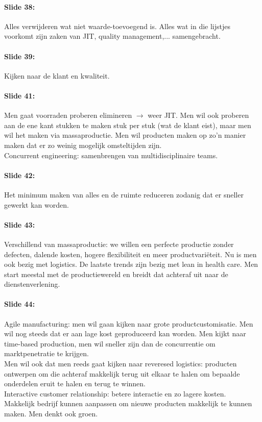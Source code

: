 \documentclass[10pt,a4paper]{report}
\begin{document}
\paragraph{Slide 38:} Alles verwijderen wat niet waarde-toevoegend is.
Alles wat in die lijstjes voorkomt zijn zaken van JIT, quality management,... samengebracht.

\paragraph{Slide 39:} Kijken naar de klant en kwaliteit. 

\paragraph{Slide 41:} Men gaat voorraden proberen elimineren $\rightarrow$ weer JIT. Men wil ook proberen aan de ene kant stukken te maken stuk per stuk (wat de klant eist), maar men wil het maken via massaproductie. Men wil producten maken op zo'n manier maken dat er zo weinig mogelijk omsteltijden zijn.\\
Concurrent engineering: samenbrengen van multidisciplinaire teams.

\paragraph{Slide 42:} Het minimum maken van alles en de ruimte reduceren zodanig dat er sneller gewerkt kan worden.

\paragraph{Slide 43:} Verschillend van massaproductie: we willen een perfecte productie zonder defecten, dalende kosten, hogere flexibiliteit en meer productvari\"eteit. Nu is men ook bezig met logistics. De laatste trends zijn bezig met lean in health care. Men start meestal met de productiewereld en breidt dat achteraf uit naar de dienstenverlening.

\paragraph{Slide 44:} Agile manufacturing: men wil gaan kijken naar grote productcustomisatie. Men wil nog steeds dat er aan lage kost geproduceerd kan worden. Men kijkt naar time-based production, men wil sneller zijn dan de concurrentie om marktpenetratie te krijgen.\\
Men wil ook dat men reeds gaat kijken naar reveresed logistics: producten ontwerpen om die achteraf makkelijk terug uit elkaar te halen om bepaalde onderdelen eruit te halen en terug te winnen.\\
Interactive customer relationship: betere interactie en zo lagere kosten.\\
Makkelijk bedrijf kunnen aanpassen om nieuwe producten makkelijk te kunnen maken.
Men denkt ook groen.
\end{document}
